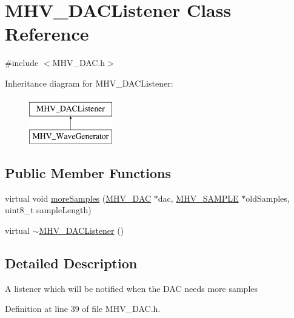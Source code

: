 \hypertarget{class_m_h_v___d_a_c_listener}{\section{M\-H\-V\-\_\-\-D\-A\-C\-Listener Class Reference}
\label{class_m_h_v___d_a_c_listener}
}


{\ttfamily \#include $<$M\-H\-V\-\_\-\-D\-A\-C.\-h$>$}

Inheritance diagram for M\-H\-V\-\_\-\-D\-A\-C\-Listener\-:\begin{figure}[H]
\begin{center}
\leavevmode
\includegraphics[height=2.000000cm]{class_m_h_v___d_a_c_listener}
\end{center}
\end{figure}
\subsection*{Public Member Functions}
\begin{DoxyCompactItemize}
\item 
virtual void \hyperlink{class_m_h_v___d_a_c_listener_a13bdc72b48cbe990100bf9da86a6ac43}{more\-Samples} (\hyperlink{class_m_h_v___d_a_c}{M\-H\-V\-\_\-\-D\-A\-C} $\ast$dac, \hyperlink{_m_h_v___d_a_c_8h_a5ed12db0bcd6a3870733daecfb30e640}{M\-H\-V\-\_\-\-S\-A\-M\-P\-L\-E} $\ast$old\-Samples, uint8\-\_\-t sample\-Length)
\item 
virtual \hyperlink{class_m_h_v___d_a_c_listener_a5791cc46d7a10e65410c3783aa76db6f}{$\sim$\-M\-H\-V\-\_\-\-D\-A\-C\-Listener} ()
\end{DoxyCompactItemize}


\subsection{Detailed Description}
A listener which will be notified when the D\-A\-C needs more samples 

Definition at line 39 of file M\-H\-V\-\_\-\-D\-A\-C.\-h.



